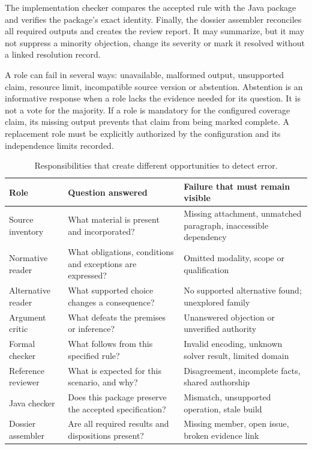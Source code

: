 \documentclass[12pt,a4paper,oneside,openany]{book}
\begin{document}
The implementation checker compares the accepted rule with the Java package and
verifies the package's exact identity. Finally, the dossier assembler reconciles
all required outputs and creates the review report. It may summarize, but it may
not suppress a minority objection, change its severity or mark it resolved without
a linked resolution record.

A role can fail in several ways: unavailable, malformed output, unsupported
claim, resource limit, incompatible source version or abstention. Abstention is
an informative response when a role lacks the evidence needed for its question.
It is not a vote for the majority. If a role is mandatory for the configured
coverage claim, its missing output prevents that claim from being marked complete.
A replacement role must be explicitly authorized by the configuration and its
independence limits recorded.

\begin{table}[htbp]
\centering\small
\caption{Responsibilities that create different opportunities to detect error.}
\label{tab:ensemble-roles}
\begin{tabularx}{\textwidth}{P{31mm}YY}
\toprule
Role & Question answered & Failure that must remain visible\\
\midrule
Source inventory & What material is present and incorporated? & Missing attachment, unmatched paragraph, inaccessible dependency\\
Normative reader & What obligations, conditions and exceptions are expressed? & Omitted modality, scope or qualification\\
Alternative reader & What supported choice changes a consequence? & No supported alternative found; unexplored family\\
Argument critic & What defeats the premises or inference? & Unanswered objection or unverified authority\\
Formal checker & What follows from this specified rule? & Invalid encoding, unknown solver result, limited domain\\
Reference reviewer & What is expected for this scenario, and why? & Disagreement, incomplete facts, shared authorship\\
Java checker & Does this package preserve the accepted specification? & Mismatch, unsupported operation, stale build\\
Dossier assembler & Are all required results and dispositions present? & Missing member, open issue, broken evidence link\\
\bottomrule
\end{tabularx}
\end{table}
\end{document}
